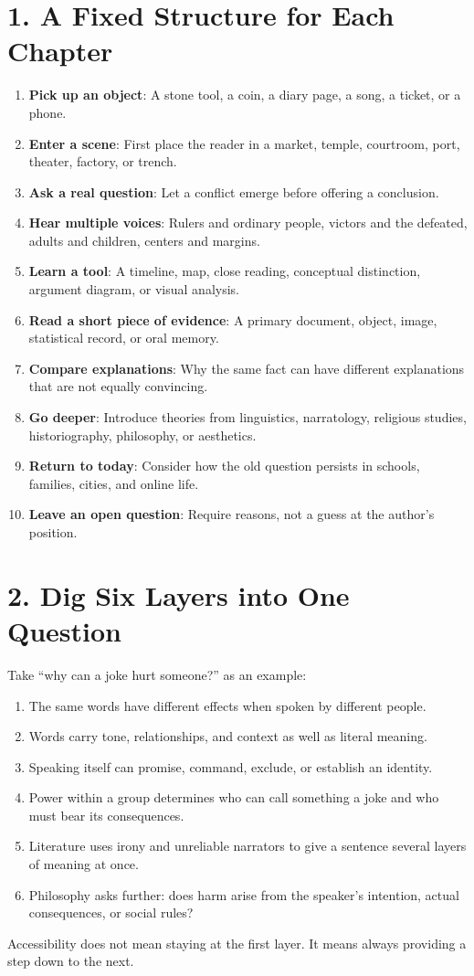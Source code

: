 \section*{1. A Fixed Structure for Each Chapter}
\begin{enumerate}
\item \textbf{Pick up an object}: A stone tool, a coin, a diary page, a song, a ticket, or a phone.
\item \textbf{Enter a scene}: First place the reader in a market, temple, courtroom, port, theater, factory, or trench.
\item \textbf{Ask a real question}: Let a conflict emerge before offering a conclusion.
\item \textbf{Hear multiple voices}: Rulers and ordinary people, victors and the defeated, adults and children, centers and margins.
\item \textbf{Learn a tool}: A timeline, map, close reading, conceptual distinction, argument diagram, or visual analysis.
\item \textbf{Read a short piece of evidence}: A primary document, object, image, statistical record, or oral memory.
\item \textbf{Compare explanations}: Why the same fact can have different explanations that are not equally convincing.
\item \textbf{Go deeper}: Introduce theories from linguistics, narratology, religious studies, historiography, philosophy, or aesthetics.
\item \textbf{Return to today}: Consider how the old question persists in schools, families, cities, and online life.
\item \textbf{Leave an open question}: Require reasons, not a guess at the author's position.
\end{enumerate}
\section*{2. Dig Six Layers into One Question}
Take ``why can a joke hurt someone?'' as an example:

\begin{enumerate}
\item The same words have different effects when spoken by different people.
\item Words carry tone, relationships, and context as well as literal meaning.
\item Speaking itself can promise, command, exclude, or establish an identity.
\item Power within a group determines who can call something a joke and who must bear its consequences.
\item Literature uses irony and unreliable narrators to give a sentence several layers of meaning at once.
\item Philosophy asks further: does harm arise from the speaker's intention, actual consequences, or social rules?
\end{enumerate}
Accessibility does not mean staying at the first layer. It means always providing a step down to the next.

